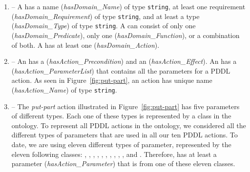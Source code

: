 %
%
\begin{enumerate}
\item {} -- A  has a name (\emph{hasDomain\_Name}) of type \texttt{string}, at least one requirement (\emph{hasDomain\_Requirement}) of type \texttt{string}, and at least a type (\emph{hasDomain\_Type}) of type \texttt{string}. A  can consist of only one  (\emph{hasDomain\_Predicate}), only one  (\emph{hasDomain\_Function}), or a combination of both. A  has at least one  (\emph{hasDomain\_Action}).
\item {} -- An  has a  (\emph{hasAction\_Precondition}) and an  (\emph{hasAction\_Effect}). An  has a  (\emph{hasAction\_ParameterList}) that contains all the parameters for a PDDL action. As seen in Figure~\ref{fig:put-part}, an action has unique name (\emph{hasAction\_Name}) of type \texttt{string}.
\item {} -- The \textsl{put-part} action illustrated in Figure~\ref{fig:put-part} has five parameters of different types. Each one of these types is represented by a class in the  ontology. To represent all PDDL actions in the  ontology, we considered all the different types of parameters that are used in all our ten PDDL actions. To date, we are using eleven different types of parameter, represented by the eleven following classes: , , , , , , , , , , and . Therefore,  has at least a parameter (\emph{hasAction\_Parameter}) that is from one of these eleven classes.


\end{enumerate}
